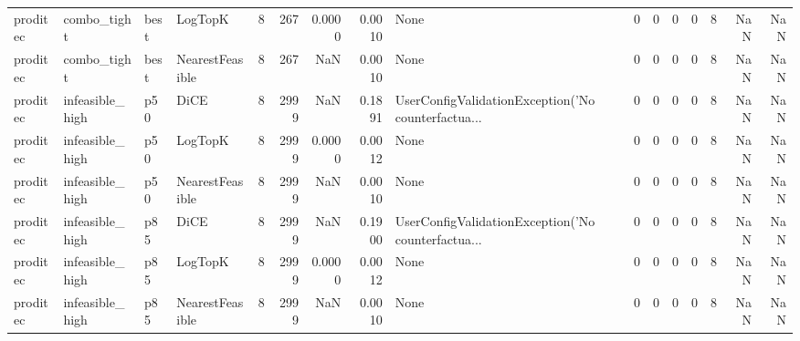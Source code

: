 \begin{tabular}{llllrrrrlrrrrrrr}
proditec &          combo\_tight &   best &         LogTopK &            8 &                  267 &                   0.0000 &      0.0010 &                                               None &      0 &            0 &        0 &              0 &          8 &                NaN &            NaN \\
proditec &          combo\_tight &   best & NearestFeasible &            8 &                  267 &                      NaN &      0.0010 &                                               None &      0 &            0 &        0 &              0 &          8 &                NaN &            NaN \\
proditec &      infeasible\_high &    p50 &            DiCE &            8 &                 2999 &                      NaN &      0.1891 & UserConfigValidationException('No counterfactua... &      0 &            0 &        0 &              0 &          8 &                NaN &            NaN \\
proditec &      infeasible\_high &    p50 &         LogTopK &            8 &                 2999 &                   0.0000 &      0.0012 &                                               None &      0 &            0 &        0 &              0 &          8 &                NaN &            NaN \\
proditec &      infeasible\_high &    p50 & NearestFeasible &            8 &                 2999 &                      NaN &      0.0010 &                                               None &      0 &            0 &        0 &              0 &          8 &                NaN &            NaN \\
proditec &      infeasible\_high &    p85 &            DiCE &            8 &                 2999 &                      NaN &      0.1900 & UserConfigValidationException('No counterfactua... &      0 &            0 &        0 &              0 &          8 &                NaN &            NaN \\
proditec &      infeasible\_high &    p85 &         LogTopK &            8 &                 2999 &                   0.0000 &      0.0012 &                                               None &      0 &            0 &        0 &              0 &          8 &                NaN &            NaN \\
proditec &      infeasible\_high &    p85 & NearestFeasible &            8 &                 2999 &                      NaN &      0.0010 &                                               None &      0 &            0 &        0 &              0 &          8 &                NaN &            NaN \\

\end{tabular}
